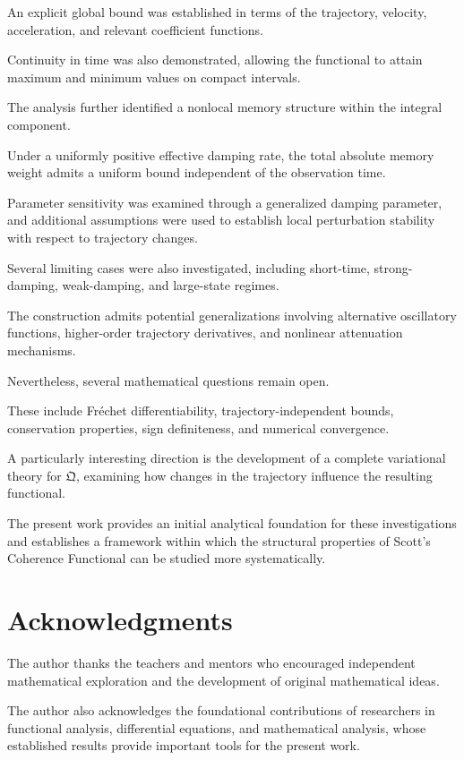 \documentclass[12pt]{article}
\numberwithin{equation}{section}
\newcommand{\Q}{\mathfrak{Q}}
\theoremstyle{definition}
\theoremstyle{remark}
\begin{document}
An explicit global bound was established
in terms of the trajectory, velocity,
acceleration, and relevant coefficient
functions.

Continuity in time was also demonstrated,
allowing the functional to attain maximum
and minimum values on compact intervals.

The analysis further identified a
nonlocal memory structure within the
integral component.

Under a uniformly positive effective
damping rate, the total absolute memory
weight admits a uniform bound independent
of the observation time.

Parameter sensitivity was examined
through a generalized damping parameter,
and additional assumptions were used
to establish local perturbation stability
with respect to trajectory changes.

Several limiting cases were also
investigated, including short-time,
strong-damping, weak-damping, and
large-state regimes.

The construction admits potential
generalizations involving alternative
oscillatory functions, higher-order
trajectory derivatives, and nonlinear
attenuation mechanisms.

Nevertheless, several mathematical
questions remain open.

These include Fréchet differentiability,
trajectory-independent bounds,
conservation properties, sign definiteness,
and numerical convergence.

A particularly interesting direction
is the development of a complete
variational theory for \(\Q\), examining
how changes in the trajectory influence
the resulting functional.

The present work provides an initial
analytical foundation for these
investigations and establishes a
framework within which the structural
properties of Scott's Coherence Functional
can be studied more systematically.


\section{Acknowledgments}

The author thanks the teachers and mentors
who encouraged independent mathematical
exploration and the development of
original mathematical ideas.

The author also acknowledges the
foundational contributions of researchers
in functional analysis, differential
equations, and mathematical analysis,
whose established results provide
important tools for the present work.
\end{document}
